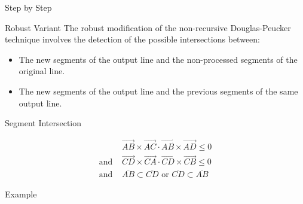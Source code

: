 \documentclass[10pt]{beamer}
\begin{document}
\begin{frame}{Step by Step}
	\begin{figure}[h]
	\end{figure}
\end{frame}


\begin{frame}{Robust Variant}
	The robust modification of the non-recursive Douglas-Peucker technique 
	involves the detection of the possible intersections between:
	\begin{itemize}
		\item The new segments of the output line and the non-processed
			  segments of the original line.
		\item The new segments of the output line and the previous 
			  segments of the same output line.
	\end{itemize}		
\end{frame}	

\begin{frame}{Segment Intersection}
	\begin{figure}[h]
	\end{figure}
	\begin{align*}
					&	\overrightarrow{AB}\times\overrightarrow{AC} \cdot \overrightarrow{AB}\times\overrightarrow{AD} \leq 0 \\
	  \text{and } 	&	\overrightarrow{CD}\times\overrightarrow{CA} \cdot \overrightarrow{CD}\times\overrightarrow{CB} \leq 0 \\
	  \text{and } 	&	\overline{AB} \subset \overline{CD} \text{ or }  \overline{CD}  \subset \overline{AB} 	  	
	\end{align*}

\end{frame}


\begin{frame}{Example}
	\begin{figure}[h]
	\end{figure}
\end{frame}
\end{document}
